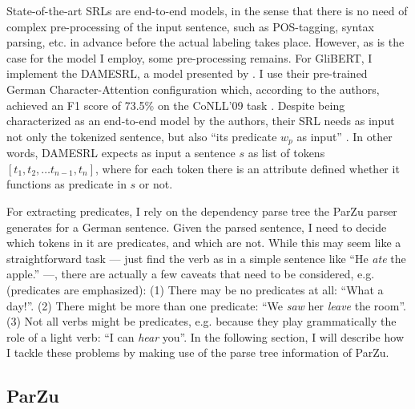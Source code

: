 State-of-the-art SRLs are end-to-end models, in the sense that there is no need of
complex pre-processing of the input sentence, such as POS-tagging, syntax parsing, etc.
in advance before the actual labeling takes place. However, as is the case for the model
I employ, some pre-processing remains. For GliBERT, I implement the DAMESRL, a model
presented by \cite{do2018flexible}. I use their pre-trained German Character-Attention
configuration which, according to the authors, achieved an F1 score of 73.5\% on the
CoNLL'09 task \citep{hajivc2009conll}. Despite being characterized as an end-to-end
model by the authors, their SRL needs as input not only the tokenized sentence, but also
``its predicate $w_p$ as input'' \citep{do2018flexible}. In other words, DAMESRL expects
as input a sentence $s$ as list of tokens $[ t_1, t_2, \dotsc t_{n-1}, t_n ]$, where for
each token there is an attribute defined whether it functions as predicate in $s$ or
not.

For extracting predicates, I rely on the dependency parse tree the ParZu parser
\cite{sennrich2013exploiting} generates for a German sentence. Given the parsed
sentence, I need to decide which tokens in it are predicates, and which are not.
While this may seem like a straightforward task --- just find the verb as in a
simple sentence like ``He \emph{ate} the apple.'' ---, there are actually a few
caveats that need to be considered, e.g. (predicates are emphasized): (1) There
may be no predicates at all: ``What a day!''. (2) There might be more than one
predicate: ``We \emph{saw} her \emph{leave} the room''. (3) Not all verbs might
be predicates, e.g. because they play grammatically the role of a light verb: ``I
can \emph{hear} you''. In the following section, I will describe how I tackle
these problems by making use of the parse tree information of ParZu.


\subsection{ParZu}


